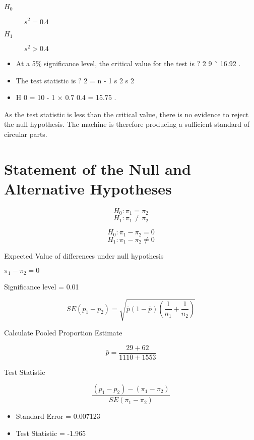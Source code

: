 	\begin{description}
		\item[$H_0$] $s^2=0.4$
		\item[$H_1$] $s^2>0.4$
	\end{description} 
	
	\begin{itemize}
		\item At a 5\% significance level, the critical value for the test is ? 2 9 ˜ 16.92 . 
		\item The test statistic is ? 2 = n - 1 s 2 s 2 
		\item H 0 = 10 - 1 × 0.7 0.4 = 15.75 .
	\end{itemize}
	
	
	
	
	As the test statistic is less than the critical value, there is no evidence to reject the null hypothesis. The machine is therefore producing a sufficient standard of circular parts.
	


\section{Statement of the Null and Alternative Hypotheses}
\[H_0 : \pi_1 = \pi_2\]
\[H_1 : \pi_1 \neq \pi_2\]

\[H_0 : \pi_1 - \pi_2 = 0\]
\[H_1 : \pi_1 -  \pi_2 \neq 0\]

Expected Value of differences under null hypothesis

$\pi_1 - \pi_2 = 0$


Significance level = 0.01

\[SE(p_1 - p_2) = \sqrt{\bar{p}(1-\bar{p})\left( \frac{1}{n_1} + \frac{1}{n_2} \right)  }\]

Calculate Pooled Proportion Estimate

\[ \bar{p} = \frac{29 + 62}{1110 + 1553} \]

Test Statistic

\[ \frac{(p_1 - p_2) - (\pi_1 - \pi_2)}{SE(\pi_1 - \pi_2)} \]


\begin{itemize}
	\item Standard Error = 0.007123
	\item Test Statistic = -1.965
\end{itemize}



